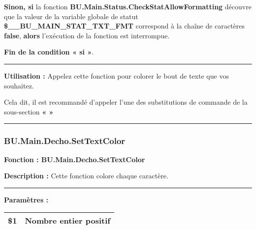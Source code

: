 \documentclass[a4paper,10pt]{article}
\begin{document}
\begin{justify}
    \textbf{\color{cond}Sinon, si} la fonction \textbf{\color{func}BU.Main.Status.CheckStatAllowFormatting} découvre que la valeur de la variable globale de statut \textbf{\color{vars}\$\_\_BU\_MAIN\_STAT\_TXT\_FMT} correspond à la chaîne de caractères \textbf{false}, \textbf{\color{cond}alors} l'exécution de la fonction est interrompue.
\end{justify}

\begin{justify}
    \textbf{\color{cond}Fin de la condition « si »}.
\end{justify}


\par\noindent\rule{\textwidth}{0.4pt}

\begin{justify}
    \textbf{Utilisation :} Appelez cette fonction pour colorer le bout de texte que vos souhaitez.
\end{justify}

\begin{justify}
    Cela dit, il est recommandé d'appeler l'une des substitutions de commande de la sous-section \textbf{\color{sec2}«  »}
\end{justify}






\color{sec3}\par\noindent\rule{\textwidth}{0.4pt}\color{text}

\color{sec3}
\subsubsection{BU.Main.Decho.SetTextColor}\color{text}

\begin{justify}
    \textbf{Fonction : \color{func}BU.Main.Decho.SetTextColor}
\end{justify}

\begin{justify}
    \textbf{Description :} Cette fonction colore chaque caractère.
\end{justify}


\par\noindent\rule{\textwidth}{0.4pt}

\begin{justify}
    \textbf{Paramètres :}

    \begin{tabular}{|l|l|}
        \hline
        \textbf{\color{orange}\$1} & Nombre entier positif\\
        \hline
    \end{tabular}
\end{justify}
\end{document}
